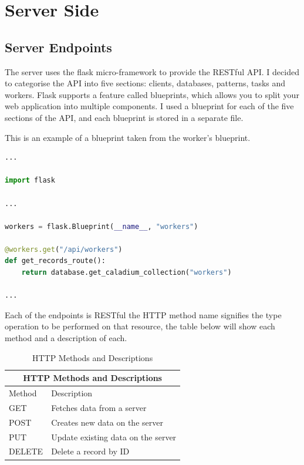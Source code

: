\section{Server Side}

\subsection{Server Endpoints}
The server uses the flask micro-framework to provide the RESTful API.
I decided to categorise the API into five sections: clients, databases, patterns, tasks and workers.
Flask supports a feature called blueprints, which allows you to split your web application into multiple components.
I used a blueprint for each of the five sections of the API, and each blueprint is stored in a separate file.

This is an example of a blueprint taken from the worker's blueprint.
\begin{lstlisting}[language=python]
...

import flask

...

workers = flask.Blueprint(__name__, "workers")

@workers.get("/api/workers")
def get_records_route():
    return database.get_caladium_collection("workers")

...
\end{lstlisting}

Each of the endpoints is RESTful the HTTP method name signifies the type operation to be performed on that resource, the table below will show each method and a description of each.

\begin{table}
    \centering
    \begin{tabular}{|p{2cm}|p{6cm}|}
        \hline
        \multicolumn{2}{|c|}{HTTP Methods and Descriptions} \\
        \hline
        Method & Description\\
        \hline
        GET & Fetches data from a server\\
        \hline
        POST & Creates new data on the server\\
        \hline
        PUT & Update existing data on the server\\
        \hline
        DELETE & Delete a record by ID\\
        \hline
    \end{tabular}
    \caption{HTTP Methods and Descriptions}
    \label{table:httpmethods}
\end{table}

